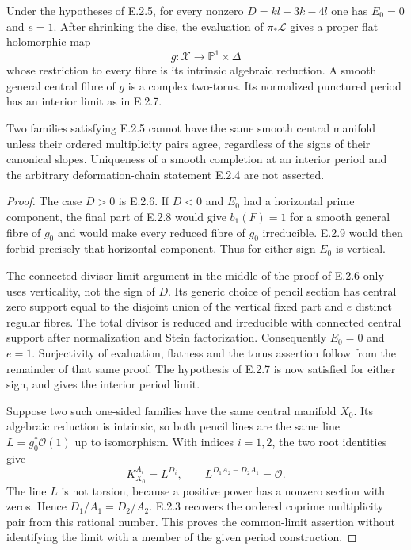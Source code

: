 \begin{proposition}
Under the hypotheses of E.2.5, for every nonzero
$D=kl-3k-4l$ one has $E_0=0$ and $e=1$.
After shrinking the disc, the evaluation of
$\pi_*\mathcal L$ gives a proper flat holomorphic map
\[
 g:\mathcal X\longrightarrow\mathbb P^1\times\Delta
\]
whose restriction to every fibre is its intrinsic algebraic
reduction.  A smooth general central fibre of $g$ is a
complex two-torus.  Its normalized punctured period has
an interior limit as in E.2.7.

Two families satisfying E.2.5 cannot have the same smooth
central manifold unless their ordered multiplicity pairs
agree, regardless of the signs of their canonical slopes.
Uniqueness of a smooth completion at an interior period and
the arbitrary deformation-chain statement E.2.4 are not
asserted.
\end{proposition}
\begin{proof}
The case $D>0$ is E.2.6.  If $D<0$ and $E_0$ had a
horizontal prime component, the final part of E.2.8 would
give $b_1(F)=1$ for a smooth general fibre of $g_0$ and
would make every reduced fibre of $g_0$ irreducible.
E.2.9 would then forbid precisely that horizontal component.
Thus for either sign $E_0$ is vertical.

The connected-divisor-limit argument in the middle of the
proof of E.2.6 only uses verticality, not the sign of $D$.
Its generic choice of pencil section has central zero
support equal to the disjoint union of the vertical fixed
part and $e$ distinct regular fibres.  The total divisor
is reduced and irreducible with connected central support
after normalization and Stein factorization.  Consequently
$E_0=0$ and $e=1$.  Surjectivity of evaluation, flatness and
the torus assertion follow from the remainder of that same
proof.  The hypothesis of E.2.7 is now satisfied for either
sign, and gives the interior period limit.

Suppose two such one-sided families have the same central
manifold $X_0$.  Its algebraic reduction is intrinsic, so
both pencil lines are the same line
$L=g_0^*\mathcal O(1)$ up to isomorphism.  With indices
$i=1,2$, the two root identities give
\[
 K_{X_0}^{A_i}=L^{D_i},\qquad
 L^{D_1A_2-D_2A_1}=\mathcal O.
\]
The line $L$ is not torsion, because a positive power has
a nonzero section with zeros.  Hence $D_1/A_1=D_2/A_2$.
E.2.3 recovers the ordered coprime multiplicity pair from
this rational number.  This proves the common-limit
assertion without identifying the limit with a member of
the given period construction.
\end{proof}

